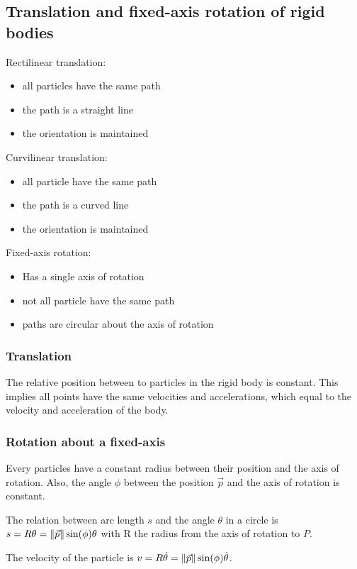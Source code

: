 \documentclass[10pt, twocolumn]{article}
\begin{document}
\subsection{Translation and fixed-axis rotation of rigid bodies}
Rectilinear translation:
\begin{itemize}
  \item all particles have the same path
  \item the path is a straight line
  \item the orientation is maintained
\end{itemize}

Curvilinear translation:
\begin{itemize}
  \item all particle have the same path
  \item the path is a curved line
  \item the orientation is maintained
\end{itemize}

Fixed-axis rotation:
\begin{itemize}
  \item Has a single axis of rotation
  \item not all particle have the same path
  \item paths are circular about the axis of rotation
\end{itemize}


\subsubsection{Translation}
The relative position between to particles in the rigid body is constant.
This implies all points have the same velocities and accelerations, which equal to the velocity and acceleration of the body.


\subsubsection{Rotation about a fixed-axis}
Every particles have a constant radius between their position and the axis of rotation.
Also, the angle \(\phi\) between the position \(\vec{p}\) and the axis of rotation is constant.

The relation between arc length \(s\) and the angle \(\theta\) in a circle is \(s = R\theta = \left\| \vec{p} \right\|\sin(\phi)\theta\) with R the radius from the axis of rotation to \(P\).

The velocity of the particle is \(v = R\dot{\theta} = \left\| \vec{p} \right\|\sin(\phi)\dot{\theta}\).
\end{document}
